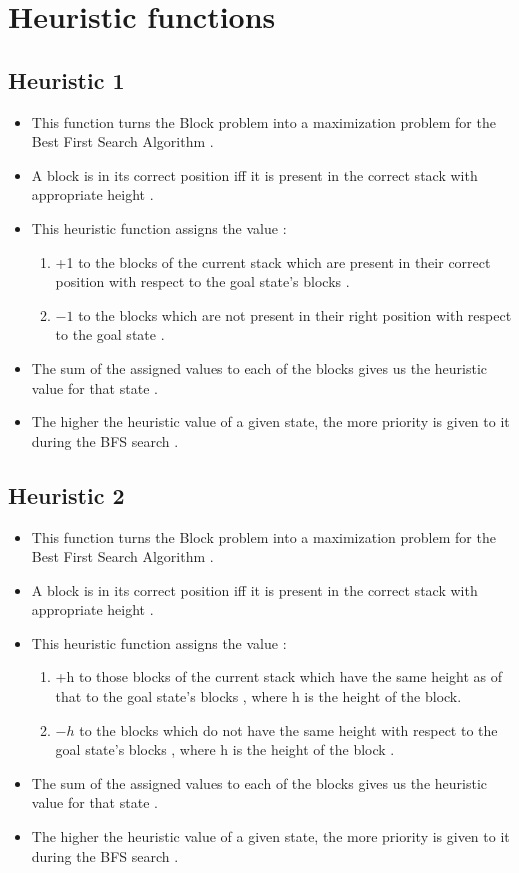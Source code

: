 \documentclass{article}
\begin{document}
\section{Heuristic functions}
\subsection{Heuristic 1}
\begin{itemize}
    \item This function turns the Block problem into a maximization problem for the Best First Search Algorithm .
    \item A block is in its correct position iff it is present in the correct stack with appropriate height .  
    \item This heuristic function assigns the value :
    \begin{enumerate}
        \item+1 to the blocks of the current stack which
        are present in their correct position with respect to the goal state's blocks .
        \item$-1$ to the blocks which are not present in their right position
        with respect to the goal state .
    \end{enumerate}
    \item The sum of the assigned values to each of the blocks gives us the heuristic value for that state .
    \item The higher the heuristic value of a given state, the more priority is given to it during the BFS search .
\end{itemize}
\subsection{Heuristic 2}
\begin{itemize}
    \item This function turns the Block problem into a maximization problem for the Best First Search Algorithm .
    \item A block is in its correct position iff it is present in the correct stack with appropriate height .  
    \item This heuristic function assigns the value :
    \begin{enumerate}
        \item+h to those blocks of the current stack which
        have the same height as of that to the goal state's blocks , where h is the height of the block.
        \item$-h$ to the blocks which do not have the same height with respect to the
        goal state's blocks , where h is the height of the block .
    \end{enumerate}
    \item The sum of the assigned values to each of the blocks gives us the heuristic value for that state .
    \item The higher the heuristic value of a given state, the more priority is given to it during the BFS search .
\end{itemize}
\end{document}
